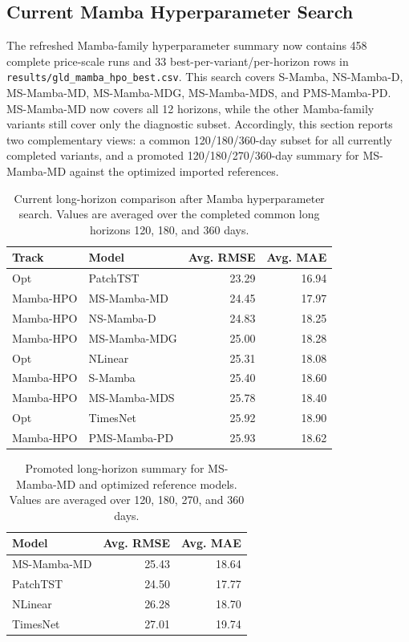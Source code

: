 \subsection{Current Mamba Hyperparameter Search}

The refreshed Mamba-family hyperparameter summary now contains 458 complete price-scale runs and 33 best-per-variant/per-horizon rows in \texttt{results/gld\_mamba\_hpo\_best.csv}.
This search covers S-Mamba, NS-Mamba-D, MS-Mamba-MD, MS-Mamba-MDG, MS-Mamba-MDS, and PMS-Mamba-PD.
MS-Mamba-MD now covers all 12 horizons, while the other Mamba-family variants still cover only the diagnostic subset. Accordingly, this section reports two complementary views: a common 120/180/360-day subset for all currently completed variants, and a promoted 120/180/270/360-day summary for MS-Mamba-MD against the optimized imported references.

\begin{table}[t]
\centering
\caption{Current long-horizon comparison after Mamba hyperparameter search. Values are averaged over the completed common long horizons 120, 180, and 360 days.}
\label{tab:gld-mamba-hpo-long}
\begin{tabular}{llrr}
\toprule
Track & Model & Avg. RMSE & Avg. MAE \\
\midrule
Opt & PatchTST & 23.29 & 16.94 \\
Mamba-HPO & MS-Mamba-MD & 24.45 & 17.97 \\
Mamba-HPO & NS-Mamba-D & 24.83 & 18.25 \\
Mamba-HPO & MS-Mamba-MDG & 25.00 & 18.28 \\
Opt & NLinear & 25.31 & 18.08 \\
Mamba-HPO & S-Mamba & 25.40 & 18.60 \\
Mamba-HPO & MS-Mamba-MDS & 25.78 & 18.40 \\
Opt & TimesNet & 25.92 & 18.90 \\
Mamba-HPO & PMS-Mamba-PD & 25.93 & 18.62 \\
\bottomrule
\end{tabular}
\end{table}

\begin{table}[t]
\centering
\caption{Promoted long-horizon summary for MS-Mamba-MD and optimized reference models. Values are averaged over 120, 180, 270, and 360 days.}
\label{tab:gld-mamba-hpo-promoted}
\begin{tabular}{lrr}
\toprule
Model & Avg. RMSE & Avg. MAE \\
\midrule
MS-Mamba-MD & 25.43 & 18.64 \\
PatchTST & 24.50 & 17.77 \\
NLinear & 26.28 & 18.70 \\
TimesNet & 27.01 & 19.74 \\
\bottomrule
\end{tabular}
\end{table}


